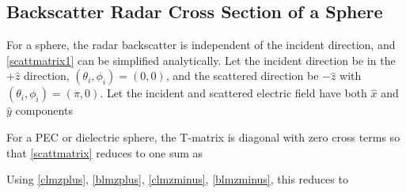 \clearpage
\newpage
\subsection{Backscatter Radar Cross Section of a Sphere}


For a sphere, the radar backscatter is independent of the incident direction, and \eqref{scattmatrix1} can be simplified analytically.  Let the incident direction be in the $+\hat{z}$ direction, $(\theta_i,\phi_i) = (0,0)$, and the scattered direction be $-\hat{z}$ with $(\theta_i,\phi_i) = (\pi,0)$.  Let the incident and scattered electric field have both $\hat{x}$ and $\hat{y}$ components   



For a PEC or dielectric sphere, the T-matrix is diagonal with zero cross terms so that \eqref{scattmatrix} reduces to one sum as 

Using \eqref{clmzplus}, \eqref{blmzplus}, \eqref{clmzminus}, \eqref{blmzminus}, this reduces to

